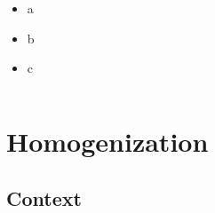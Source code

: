 \documentclass[compress]{beamer}
\begin{document}
\begin{frame}
{\begin{columns}[totalwidth=\textwidth]
\begin{column}{.49\textwidth}
   \begin{exampleblock}{}
   \begin{itemize}[label=$\bullet$, font=\small, leftmargin=*]
	\item a
	\item b
	\item c
	\end{itemize}
	\end{exampleblock}
   \end{column}
\end{columns}
}
\end{frame}

\section{Homogenization}
\subsection{Context}
\end{document}
